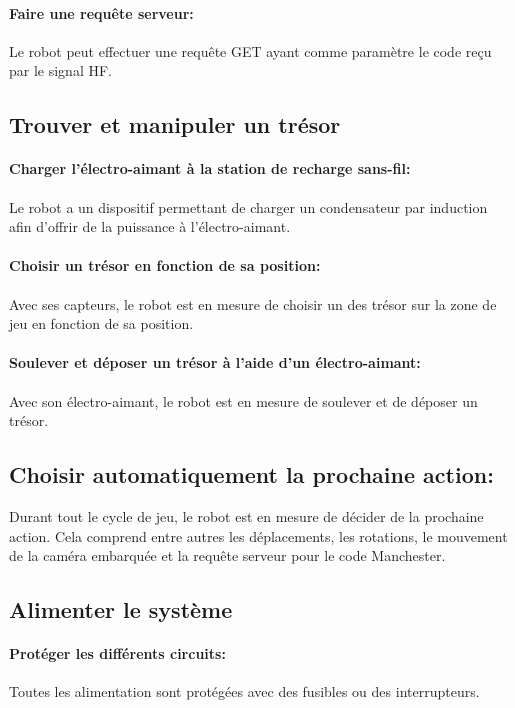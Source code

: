 \paragraph{Faire une requête serveur:}
Le robot peut effectuer une requête GET ayant comme paramètre le code reçu par le signal HF.

\subsection{Trouver et manipuler un trésor}

\paragraph{Charger l'électro-aimant à la station de recharge sans-fil:}
Le robot a un dispositif permettant de charger un condensateur par induction afin d'offrir de la puissance à l'électro-aimant.

\paragraph{Choisir un trésor en fonction de sa position:}
Avec ses capteurs, le robot est en mesure de choisir un des trésor sur la zone de jeu en fonction de sa position.

\paragraph{Soulever et déposer un trésor à l'aide d'un électro-aimant:}
Avec son électro-aimant, le robot est en mesure de soulever et de déposer un trésor.

\subsection{Choisir automatiquement la prochaine action:}
Durant tout le cycle de jeu, le robot est en mesure de décider de la prochaine action. Cela comprend entre autres les déplacements, les rotations, le mouvement de la caméra embarquée
et la requête serveur pour le code Manchester.

\subsection{Alimenter le système}

\paragraph{Protéger les différents circuits:}
Toutes les alimentation sont protégées avec des fusibles ou des interrupteurs.

